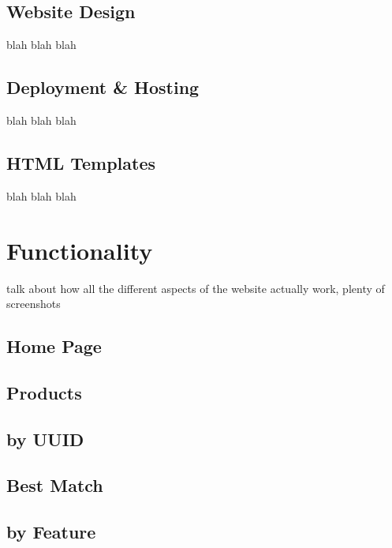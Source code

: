 \documentclass[
	letterpaper, %
	11pt, %
]{CSUniSchoolLabReport}
\begin{document}
\subsection{Website Design}\label{website}

blah blah blah

\subsection{Deployment & Hosting}\label{hosting}

blah blah blah

\subsection{HTML Templates}\label{templates}

blah blah blah

\section{Functionality}\label{functionality}

talk about how all the different aspects of the website actually work, plenty of screenshots

\subsection{Home Page}\label{home}

\subsection{Products}\label{products}

\subsection{by UUID}\label{uuid}

\subsection{Best Match}\label{best}

\subsection{by Feature}\label{feature}

\end{document}
